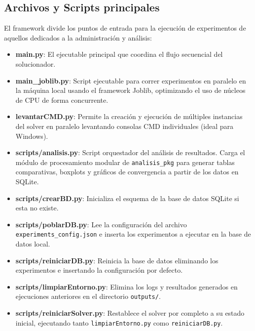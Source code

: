 \subsection{Archivos y Scripts principales}

El framework divide los puntos de entrada para la ejecución de experimentos de aquellos dedicados a la administración y análisis:

\begin{itemize}
    \item \textbf{main.py}: El ejecutable principal que coordina el flujo secuencial del solucionador.
    \item \textbf{main\_joblib.py}: Script ejecutable para correr experimentos en paralelo en la máquina local usando el framework Joblib, optimizando el uso de núcleos de CPU de forma concurrente.
    \item \textbf{levantarCMD.py}: Permite la creación y ejecución de múltiples instancias del solver en paralelo levantando consolas CMD individuales (ideal para Windows).
    \item \textbf{scripts/analisis.py}: Script orquestador del análisis de resultados. Carga el módulo de procesamiento modular de \texttt{analisis\_pkg} para generar tablas comparativas, boxplots y gráficos de convergencia a partir de los datos en SQLite.
    \item \textbf{scripts/crearBD.py}: Inicializa el esquema de la base de datos SQLite si esta no existe.
    \item \textbf{scripts/poblarDB.py}: Lee la configuración del archivo \texttt{experiments\_config.json} e inserta los experimentos a ejecutar en la base de datos local.
    \item \textbf{scripts/reiniciarDB.py}: Reinicia la base de datos eliminando los experimentos e insertando la configuración por defecto.
    \item \textbf{scripts/limpiarEntorno.py}: Elimina los logs y resultados generados en ejecuciones anteriores en el directorio \texttt{outputs/}.
    \item \textbf{scripts/reiniciarSolver.py}: Restablece el solver por completo a su estado inicial, ejecutando tanto \texttt{limpiarEntorno.py} como \texttt{reiniciarDB.py}.
\end{itemize}
